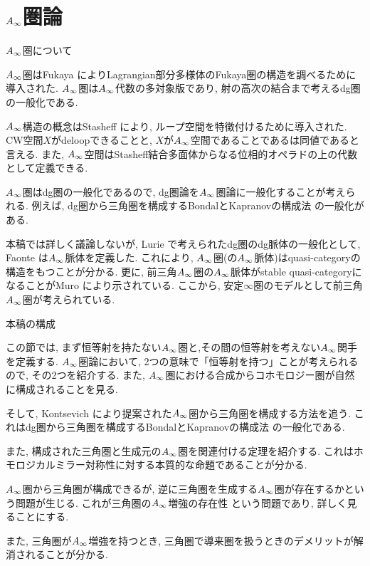 \documentclass[aspectratio=169, dvipdfmx, 8pt, notheorems, uplatex]{beamer}
\begin{document}
\section{$A_\infty$圏論}

\begin{frame}{$A_\infty$圏について}
  \begin{block}{}
    $A_\infty$圏はFukaya \cite{Fuk93}\cite{Fuk96}によりLagrangian部分多様体のFukaya圏の構造を調べるために導入された. 
    $A_\infty$圏は$A_\infty$代数の多対象版であり, 射の高次の結合まで考えるdg圏の一般化である. \bigskip

    $A_\infty$構造の概念はStasheff \cite{Sta63}により, ループ空間を特徴付けるために導入された. 
    CW空間$X$がdeloopできることと, $X$が$A_\infty$空間であることであるは同値であると言える. 
    また, $A_\infty$空間はStasheff結合多面体からなる位相的オペラドの上の代数として定義できる. \bigskip

    $A_\infty$圏はdg圏の一般化であるので, dg圏論を$A_\infty$圏論に一般化することが考えられる. 
    例えば, dg圏から三角圏を構成するBondalとKapranovの構成法 \cite{BK}の一般化がある. \bigskip

    本稿では詳しく議論しないが, Lurie \cite{HTT}で考えられたdg圏のdg脈体の一般化として, Faonte \cite{Fao}は$A_\infty$脈体を定義した.
    これにより, $A_\infty$圏(の$A_\infty$脈体)はquasi-categoryの構造をもつことが分かる. 
    更に, 前三角$A_\infty$圏の$A_\infty$脈体がstable quasi-categoryになることがMuro \cite{Orn}により示されている. 
    ここから, 安定$\infty$圏のモデルとして前三角$A_\infty$圏が考えられている. 
  \end{block}
\end{frame}

\begin{frame}{本稿の構成}
  \begin{block}{}
    この節では, まず恒等射を持たない$A_\infty$圏と,その間の恒等射を考えない$A_\infty$関手を定義する. 
    $A_\infty$圏論において, 2つの意味で「恒等射を持つ」ことが考えられるので, その2つを紹介する. 
    また, $A_\infty$圏における合成からコホモロジー圏が自然に構成されることを見る. \bigskip
    
    そして, Kontsevich \cite{Kon94}により提案された$A_\infty$圏から三角圏を構成する方法を追う. 
    これはdg圏から三角圏を構成するBondalとKapranovの構成法 \cite{BK}の一般化である. \bigskip

    また, 構成された三角圏と生成元の$A_\infty$圏を関連付ける定理を紹介する. 
    これはホモロジカルミラー対称性に対する本質的な命題であることが分かる. \bigskip

    $A_\infty$圏から三角圏が構成できるが, 逆に三角圏を生成する$A_\infty$圏が存在するかという問題が生じる.
    これが三角圏の$A_\infty$増強の存在性 \cite{Muro07}という問題であり, 詳しく見ることにする. \bigskip

    また, 三角圏が$A_\infty$増強を持つとき, 三角圏で導来圏を扱うときのデメリットが解消されることが分かる. 
  \end{block}
\end{frame}
\end{document}
